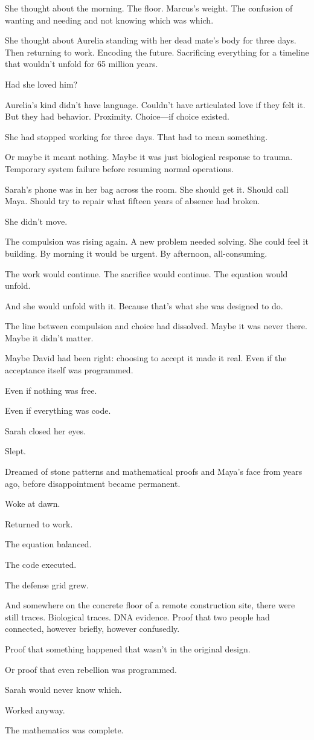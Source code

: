 She thought about the morning. The floor. Marcus's weight. The confusion of wanting and needing and not knowing which was which.

She thought about Aurelia standing with her dead mate's body for three days. Then returning to work. Encoding the future. Sacrificing everything for a timeline that wouldn't unfold for 65 million years.

Had she loved him?

Aurelia's kind didn't have language. Couldn't have articulated love if they felt it. But they had behavior. Proximity. Choice—if choice existed.

She had stopped working for three days. That had to mean something.

Or maybe it meant nothing. Maybe it was just biological response to trauma. Temporary system failure before resuming normal operations.

Sarah's phone was in her bag across the room. She should get it. Should call Maya. Should try to repair what fifteen years of absence had broken.

She didn't move.

The compulsion was rising again. A new problem needed solving. She could feel it building. By morning it would be urgent. By afternoon, all-consuming.

The work would continue. The sacrifice would continue. The equation would unfold.

And she would unfold with it. Because that's what she was designed to do.

The line between compulsion and choice had dissolved. Maybe it was never there. Maybe it didn't matter.

Maybe David had been right: choosing to accept it made it real. Even if the acceptance itself was programmed.

Even if nothing was free.

Even if everything was code.

Sarah closed her eyes.

Slept.

Dreamed of stone patterns and mathematical proofs and Maya's face from years ago, before disappointment became permanent.

Woke at dawn.

Returned to work.

The equation balanced.

The code executed.

The defense grid grew.

And somewhere on the concrete floor of a remote construction site, there were still traces. Biological traces. DNA evidence. Proof that two people had connected, however briefly, however confusedly.

Proof that something happened that wasn't in the original design.

Or proof that even rebellion was programmed.

Sarah would never know which.

Worked anyway.

The mathematics was complete.

